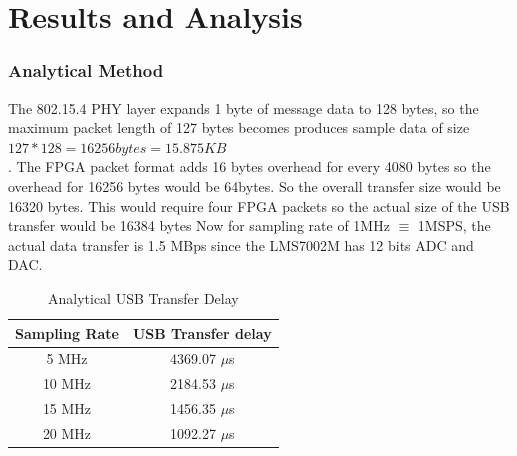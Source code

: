 \documentclass{kththesis}
\begin{document}


\frontmatter



\tableofcontents

\listoffigures
\listoftables

\clearpage
\printacronyms[%
  name = {Abbreviations},
  sort = false,
]

\mainmatter









\chapter{Results and Analysis}
\subsection{Analytical Method}
The 802.15.4 PHY layer expands 1 byte of message data to 128 bytes, so the maximum packet length of 127 bytes becomes produces sample data of size
$127*128=16256 bytes=15.875KB$\\. The FPGA packet format adds 16 bytes overhead for every 4080 bytes so the overhead for 16256 bytes would be 64bytes. So the overall transfer size would be 16320 bytes. This would require four FPGA packets so the actual size of the USB transfer would be 16384 bytes
Now for sampling rate of 1MHz $\equiv$ 1MSPS, the actual data transfer is 1.5 MBps since the LMS7002M has 12 bits ADC and DAC. 
\begin{table}[!h]
\centering
\begin{tabular}{|c|c|}
\hline
Sampling Rate & USB Transfer delay \\
\hline
5 MHz & 4369.07 $\mu$s\\
10 MHz & 2184.53 $\mu$s\\
15 MHz & 1456.35 $\mu$s\\
20 MHz & 1092.27 $\mu$s\\
\hline
\end{tabular}
\caption{Analytical USB Transfer Delay}
\label{back_env}
\end{table}
\end{document}
